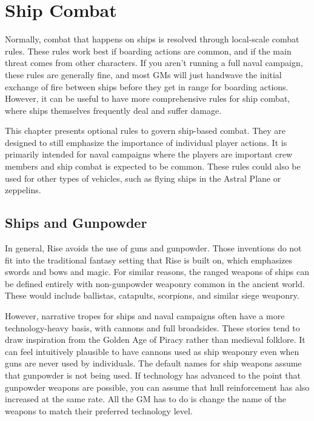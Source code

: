 \chapter{Ship Combat}
    Normally, combat that happens on ships is resolved through local-scale combat rules.
    These rules work best if boarding actions are common, and if the main threat comes from other characters.
    If you aren't running a full naval campaign, these rules are generally fine, and most GMs will just handwave the initial exchange of fire between ships before they get in range for boarding actions.
    However, it can be useful to have more comprehensive rules for ship combat, where ships themselves frequently deal and suffer damage.

    This chapter presents optional rules to govern ship-based combat.
    They are designed to still emphasize the importance of individual player actions.
    It is primarily intended for naval campaigns where the players are important crew members and ship combat is expected to be common.
    These rules could also be used for other types of vehicles, such as flying ships in the Astral Plane or zeppelins.

    \section{Ships and Gunpowder}
        In general, Rise avoids the use of guns and gunpowder.
        Those inventions do not fit into the traditional fantasy setting that Rise is built on, which emphasizes swords and bows and magic.
        For similar reasons, the ranged weapons of ships can be defined entirely with non-gunpowder weaponry common in the ancient world.
        These would include ballistas, catapults, scorpions, and similar siege weaponry.

        However, narrative tropes for ships and naval campaigns often have a more technology-heavy basis, with cannons and full broadsides.
        These stories tend to draw inspiration from the Golden Age of Piracy rather than medieval folklore.
        It can feel intuitively plausible to have cannons used as ship weaponry even when guns are never used by individuals.
        The default names for ship weapons assume that gunpowder is not being used.
        If technology has advanced to the point that gunpowder weapons are possible, you can assume that hull reinforcement has also increased at the same rate.
        All the GM has to do is change the name of the weapons to match their preferred technology level.

